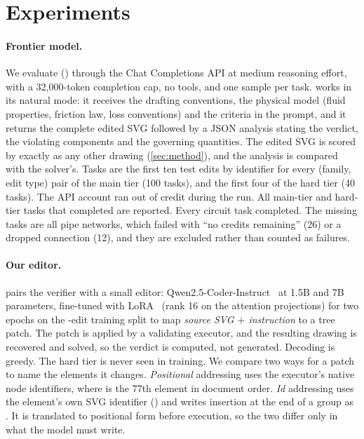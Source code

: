 \section{Experiments}
\label{sec:experiments}

\paragraph{Frontier model.} We evaluate \astra () through the Chat Completions API at medium
reasoning effort, with a 32{,}000-token completion cap, no tools,  and one sample per task.
\astra works in its natural mode: it receives the drafting conventions, the physical model (fluid properties,
friction law, loss conventions) and the criteria in the prompt, and it returns the complete edited SVG followed
by a JSON analysis stating the verdict, the violating components and the governing quantities. The edited SVG
is scored by \ours exactly as any other drawing (\cref{sec:method}), and the analysis is compared with the
solver's. Tasks are the first ten test edits by identifier for every (family, edit type) pair of the main tier
(100 tasks), and the first four of the hard tier (40 tasks). The API account ran out of credit during the run.
All \astraMainN{} main-tier and \astraHardN{} hard-tier tasks that completed are reported. Every circuit task
completed. The missing tasks are all pipe networks, which failed with ``no credits remaining'' (26) or a
dropped connection (12), and they are excluded rather than counted as failures.

\paragraph{Our editor.} \ours pairs the verifier with a small editor: Qwen2.5-Coder-Instruct~\cite{hui2024qwen25coder}
at 1.5B and 7B parameters, fine-tuned with LoRA~\cite{hu2022lora} (rank 16 on the attention projections) for two
epochs on the \netEdits{}-edit training split to map \emph{source SVG $+$ instruction} to a tree patch. The patch
is applied by a validating executor, and the resulting drawing is recovered and solved, so the verdict is
computed, not generated. Decoding is greedy. The hard tier is never seen in training. We compare two ways for
a patch to name the elements it changes. \emph{Positional} addressing uses the executor's native node
identifiers, where  is the 77th element in document order. \emph{Id} addressing uses the element's own
SVG identifier () and writes insertion at the end of a group as . It is
translated to positional form before execution, so the two differ only in what the model must write.

